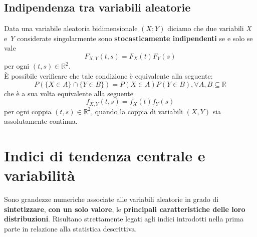 \subsection{Indipendenza tra variabili aleatorie}
Data una variabile aleatoria bidimensionale $(X; Y)$ diciamo che due variabili \textit{X} e \textit{Y} considerate singolarmente sono \textbf{stocasticamente indipendenti} se e solo se vale
\begin{equation}
	F_{X, Y} (t, s) = F_X(t) F_Y(s)
\end{equation}
per ogni $(t, s) \in \mathbb{R}^2$.\\
È possibile verificare che tale condizione è equivalente alla seguente:
\begin{equation}
	P(\{X \in A\} \cap \{Y \in B\}) = P(X \in A) P(Y \in B), \forall A,B \subseteq \mathbb{R}
\end{equation}
che è a sua volta equivalente alla seguente
\begin{equation}
	f_{X,Y}(t,s) = f_X(t) f_Y(s)
\end{equation}
per ogni coppia $(t,s) \in \mathbb{R}^2$, quando la coppia di variabili $(X, Y)$ sia assolutamente continua.

\section{Indici di tendenza centrale e variabilità}
Sono grandezze numeriche associate alle variabili aleatorie in grado di \textbf{sintetizzare},
\textbf{con un solo valore}, le \textbf{principali caratteristiche delle loro distribuzioni}. Risultano
strettamente legati agli indici introdotti nella prima parte in relazione alla statistica
descrittiva.
